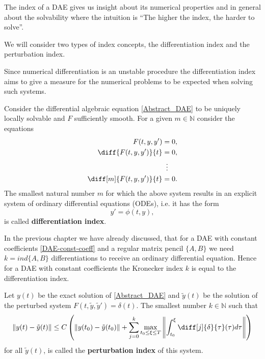 The index of a DAE gives us insight about its numerical properties and in general about the solvability where the intuition is ``The higher the index, the harder to solve''.

We will consider two types of index concepts, the differentiation index and the perturbation index.

Since numerical differentiation is an unstable procedure the differentiation index aims to give a measure for the numerical problems to be expected when solving such systems.

\begin{definition}
	Consider the differential algebraic equation \eqref{Abstract_DAE} to be uniquely locally solvable and $F$ sufficiently smooth. For a given $m \in \mathbb{N}$ consider the equations
	\begin{displaymath}
		\begin{aligned}
			F(t,y,y') &= 0, \\
			\diff{F(t,y,y')}{t} &= 0, \\
			&\vdotswithin{=} \\
			\diff[m]{F(t,y,y')}{t} &= 0.
		\end{aligned}
	\end{displaymath}
	The smallest natural number $m$ for which the above system results in an explicit system of ordinary differential equations (ODEs), i.e. it has the form
	\begin{displaymath}
		y' = \phi(t,y),
	\end{displaymath}
	is called \textbf{differentiation index}.
\end{definition}

In the previous chapter we have already discussed, that for a DAE with constant coefficients \eqref{DAE-const-coeff} and a regular matrix pencil $\{A,B\}$  we need $k = ind\{A,B\}$ differentiations to receive an ordinary differential equation. Hence for a DAE with constant coefficients the Kronecker index $k$ is equal to the differentiation index.

\begin{definition}
	Let $y(t)$ be the exact solution of \eqref{Abstract_DAE} and $\tilde{y}(t)$ be the solution of the perturbed system $F(t, \tilde{y}, \tilde{y}') = \delta(t)$. The smallest number $k \in \mathbb{N}$ such that 
	\begin{displaymath}
		\|y(t)-\tilde{y}(t)\| \leq C \left(\|y(t_0)-\tilde{y}(t_0)\|+\sum_{j=0}^{k}\max_{t_0 \leq \xi \leq T} \left\rVert 		\int_{t_0}^{\xi}\diff[j]{\delta}{\tau}(\tau)d \tau \right\rVert \right)
	\end{displaymath}
	for all $\tilde{y}(t)$, is called the \textbf{perturbation index} of this system.
\end{definition}	

